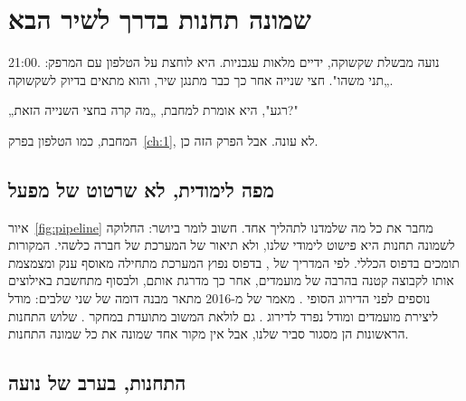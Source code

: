 
\chapter{שמונה תחנות בדרך לשיר הבא}\label{ch:6}

\begin{scene}
21:00. נועה מבשלת שקשוקה, ידיים מלאות עגבניות. היא לוחצת על הטלפון עם המרפק: „תני משהו". חצי שנייה אחר כך כבר מתנגן שיר, והוא מתאים בדיוק לשקשוקה.

„רגע", היא אומרת למחבת, „מה קרה בחצי השנייה הזאת?"

המחבת, כמו הטלפון בפרק~\ref{ch:1}, לא עונה. אבל הפרק הזה כן.
\end{scene}


\section{מפה לימודית, לא שרטוט של מפעל}

איור~\ref{fig:pipeline} מחבר את כל מה שלמדנו לתהליך אחד. חשוב לומר ביושר: החלוקה לשמונה תחנות היא פישוט לימודי שלנו, ולא תיאור של המערכת של חברה כלשהי. המקורות תומכים בדפוס הכללי. לפי המדריך של , בדפוס נפוץ המערכת מתחילה מאוסף ענק ומצמצמת אותו לקבוצה קטנה בהרבה של מועמדים, אחר כך מדרגת אותם, ולבסוף מתחשבת באילוצים נוספים לפני הדירוג הסופי \cite{google2026overview}. מאמר של  מ-2016 מתאר מבנה דומה של שני שלבים: מודל ליצירת מועמדים ומודל נפרד לדירוג \cite{covington2016deep}. גם לולאת המשוב מתועדת במחקר \cite{chaney2018algorithmic}. שלוש התחנות הראשונות הן מסגור סביר שלנו, אבל אין מקור אחד שמונה את כל שמונה התחנות.

\begin{herefigure} %
  \centering
  
  \caption{תהליך ההמלצה בשמונה תחנות: פישוט לימודי של הספר, ולא הארכיטקטורה הפנימית של פלטפורמה כלשהי \educational}
  \label{fig:pipeline}
\end{herefigure}

\section{התחנות, בערב של נועה}

